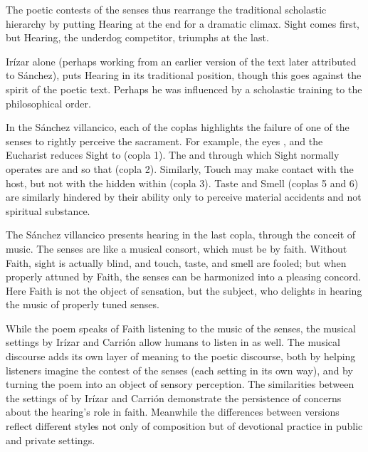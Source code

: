 The poetic contests of the senses thus rearrange the traditional scholastic
hierarchy by putting Hearing at the end for a dramatic climax.
Sight comes first, but Hearing, the underdog competitor, triumphs at the
last.
\begin{Footnote}
    Irízar alone (perhaps working from an earlier version of the text later
    attributed to Sánchez), puts Hearing in its traditional position, though
    this goes against the spirit of the poetic text.  
    Perhaps he was influenced by a scholastic training to  the
    philosophical order.
\end{Footnote}
In the Sánchez villancico, each of the coplas highlights the failure of one of
the senses to rightly perceive the sacrament.
For example, the eyes , and the Eucharist
reduces Sight to  (copla 1).
The  and  through which Sight normally
operates are   and
 so that  (copla 2).
Similarly, Touch may make contact with the host, but not with the
 hidden within (copla 3).
Taste and Smell (coplas 5 and 6) are similarly hindered by their ability only to
perceive material accidents and not spiritual substance.


The Sánchez villancico presents hearing in the last copla, through the conceit
of music.
The senses are  like a musical consort, which must be
 by faith.
Without Faith, sight is actually blind, and touch, taste, and smell are fooled;
but when properly attuned by Faith, the senses can be harmonized into a pleasing
concord.
Here Faith is not the object of sensation, but the subject, who delights in
hearing the music of properly tuned senses.

While the poem speaks of Faith listening to the music of the senses, the musical
settings by Irízar and Carrión allow humans to listen in as well.
The musical discourse adds its own layer of meaning to the poetic discourse,
both by helping listeners imagine the contest of the senses (each setting in its
own way), and by turning the poem into an object of sensory perception.
The similarities between the settings of  by Irízar and
Carrión demonstrate the persistence of concerns about the hearing's role in
faith.
Meanwhile the differences between versions reflect different styles not only of
composition but of devotional practice in public and private settings.

